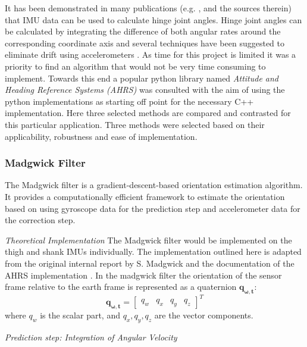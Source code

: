 It has been demonstrated in many publications (e.g. \cite{peng_cheng_joint-angle_2010}, \cite{sabatini_estimating_2011} and the sources therein) that IMU data can be used to calculate hinge joint angles. Hinge joint angles can be calculated by integrating the difference of both angular rates around the corresponding coordinate axis and several techniques have been suggested to eliminate drift using accelerometers \cite{peng_cheng_joint-angle_2010}. As time for this project is limited it was a priority to find an algorithm that would not be very time consuming to implement. Towards this end a popular python library named \textit{Attitude and Heading Reference Systems (AHRS)} \cite{noauthor_ahrs_nodate} was consulted with the aim of using the python implementations as starting off point for the necessary C++ implementation. Here three selected methods are compared and contrasted for this particular application. Three methods were selected based on their applicability, robustness and ease of implementation. 



\subsubsection{Madgwick Filter}

The Madgwick filter is a gradient-descent-based orientation estimation algorithm. It provides a computationally efficient framework to estimate the orientation based on using gyroscope data for the prediction step and accelerometer data for the correction step. 

\textit{Theoretical Implementation}
The Madgwick filter would be implemented on the thigh and shank IMUs individually. The implementation outlined here is adapted from the original internal report by S. Madgwick  \cite{madgwick_ecient_nodate} and the documentation of the AHRS implementation \cite{noauthor_madgwick_nodate}. In the madgwick filter the orientation of the sensor frame relative to the earth frame is represented as a quaternion \( \mathbf{q_{\omega , t}} \):
\[
\mathbf{q_{\omega , t}} = 
\begin{bmatrix}
q_w & q_x & q_y & q_z
\end{bmatrix}^T
\]
where \( q_w \) is the scalar part, and \( q_x, q_y, q_z \) are the vector components.

\textit{Prediction step: Integration of Angular Velocity}

